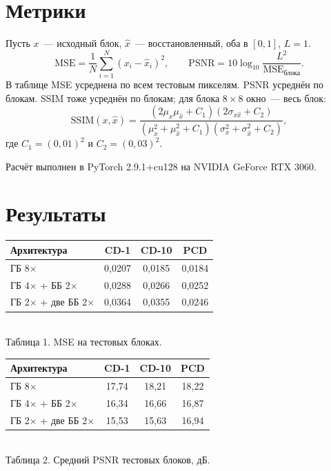 \documentclass[12pt,a4paper]{article}
\begin{document}
\section{Метрики}

Пусть $x$~--- исходный блок, $\hat x$~--- восстановленный, оба в $[0,1]$, $L = 1$.
\[
\mathrm{MSE} = \frac{1}{N}\sum_{i=1}^{N}(x_i-\hat x_i)^2,
\qquad
\mathrm{PSNR} = 10\log_{10}\frac{L^2}{\mathrm{MSE}_{\text{блока}}}.
\]
В таблице MSE усреднена по всем тестовым пикселям. PSNR усреднён по блокам. SSIM тоже усреднён по блокам; для блока $8\times8$ окно~--- весь блок:
\[
\mathrm{SSIM}(x,\hat x)
= \frac{(2\mu_x\mu_{\hat x}+C_1)(2\sigma_{x\hat x}+C_2)}
{(\mu_x^2+\mu_{\hat x}^2+C_1)(\sigma_x^2+\sigma_{\hat x}^2+C_2)},
\]
где $C_1 = (0{,}01)^2$ и $C_2 = (0{,}03)^2$.

Расчёт выполнен в PyTorch 2.9.1+cu128 на NVIDIA GeForce RTX 3060.

\section{Результаты}

\begin{center}
\begin{tabular}{lccc}
\toprule
Архитектура & CD-1 & CD-10 & PCD \\
\midrule
ГБ 8$\times$ & 0{,}0207 & 0{,}0185 & 0{,}0184 \\
ГБ 4$\times$ + ББ 2$\times$ & 0{,}0288 & 0{,}0266 & 0{,}0252 \\
ГБ 2$\times$ + две ББ 2$\times$ & 0{,}0364 & 0{,}0355 & 0{,}0246 \\
\bottomrule
\end{tabular}\\[0.4em]
{\small Таблица 1. MSE на тестовых блоках.}
\end{center}

\begin{center}
\begin{tabular}{lccc}
\toprule
Архитектура & CD-1 & CD-10 & PCD \\
\midrule
ГБ 8$\times$ & 17{,}74 & 18{,}21 & 18{,}22 \\
ГБ 4$\times$ + ББ 2$\times$ & 16{,}34 & 16{,}66 & 16{,}87 \\
ГБ 2$\times$ + две ББ 2$\times$ & 15{,}53 & 15{,}63 & 16{,}94 \\
\bottomrule
\end{tabular}\\[0.4em]
{\small Таблица 2. Средний PSNR тестовых блоков, дБ.}
\end{center}
\end{document}
